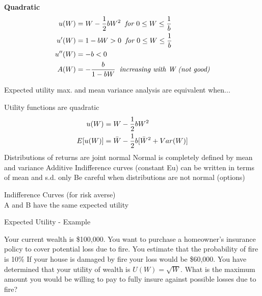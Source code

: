 \documentclass[
14pt,notheorems,hyperref={pdfauthor=whatever}
]{beamer}
\begin{document}
\begin{frame}
\textbf{Quadratic}\\
\begin{align*}
    u(W)&=W-\frac{1}{2}bW^2 \textit{\;\;for } 0\leq W\leq \frac{1}{b}\\
    u'(W)&=1-bW>0 \textit{\;\;for } 0\leq W\leq \frac{1}{b}\\
    u''(W)&=-b<0\\
    A(W)&=-\frac{b}{1-bW} \textit{\;\;increasing with W (not good)}\\
\end{align*}
\end{frame}

\begin{frame}
Expected utility max. and mean variance analysis are equivalent when...\\
\hfill \break
\begin{outline}
    \1 Utility functions are quadratic
    \begin{align*}
        u(W)&=W-\frac{1}{2}bW^2\\
        E[u(W)]&=\Bar{W}-\frac{1}{2}b[\Bar{W}^2+Var(W)]
    \end{align*}
    \1 Distributions of returns are joint normal
        \2 Normal is completely defined by mean and variance
        \2 Additive
        \2 Indifference curves (constant Eu) can be written in terms of mean and s.d. only
    \1 Be careful when distributions are not normal (options)
\end{outline}
\end{frame}

\begin{frame}
Indifference Curves (for risk averse)\\
\hfill \break
A and B have the same expected utility
\end{frame}

\begin{frame}
Expected Utility - Example
\hfill \break
\begin{outline}
    \1 Your current wealth is \$100,000.
    \1 You want to purchase a homeowner’s insurance policy to cover potential loss due to fire.
    \1 You estimate that the probability of fire is 10\%
    \1 If your house is damaged by fire your loss would be \$60,000. 
    \1 You have determined that your utility of wealth is $U(W) = \sqrt{W}$. 
    \1 What is the maximum amount you would be willing to pay to fully insure against possible losses due to fire?
\end{outline}
\end{frame}
\end{document}
